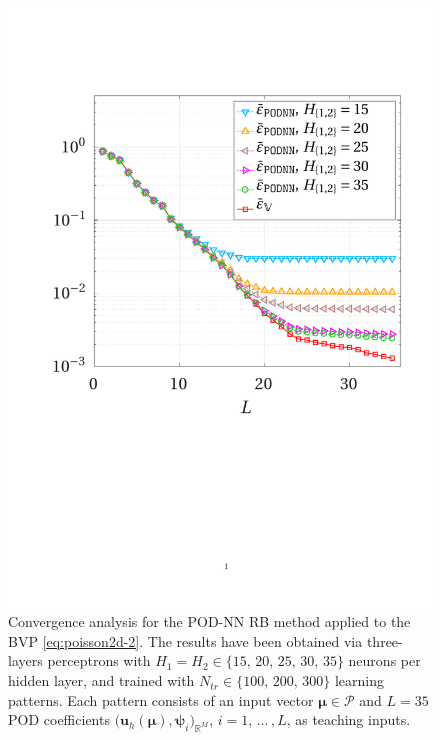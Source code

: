 \documentclass[12pt, a4paper, twoside, openright, notitlepage]{report}
\numberwithin{equation}{chapter}
\theoremstyle{theorem}
\theoremstyle{definition}
\theoremstyle{remark}
\theoremstyle{proposition}
\numberwithin{figure}{chapter}
\newcommand{\bg}[1]{\boldsymbol{#1}}
\begin{document}
\begin{figure}[H]
			\includegraphics[scale = 0.4, trim = {1.5cm 9cm 1.5cm 3.5cm}, clip]{poisson2d_2_nn_convergence}
			
			\vspace*{-0.2cm}
			
			\caption{Convergence analysis for the POD-NN RB method applied to the BVP \eqref{eq:poisson2d-2}. The results have been obtained via three-layers perceptrons with $H_1 = H_2 \in \big\lbrace 15, \, 20, \, 25, \, 30, \, 35 \big\rbrace$ neurons per hidden layer, and trained with $N_{tr} \in \big\lbrace 100, \, 200, \, 300 \big\rbrace$ learning patterns. Each pattern consists of an input vector $\bg{\mu} \in \mathcal{P}$ and $L = 35$ POD coefficients $\big( \mathbf{u}_h(\bg{\mu}), \bg{\psi}_i \big)_{\mathbb{R}^M}$, $i = 1, \, \ldots \, , L$, as teaching inputs.}
			\label{fig:poisson2d-2-fig3}
		\end{figure}
				
\end{document}
